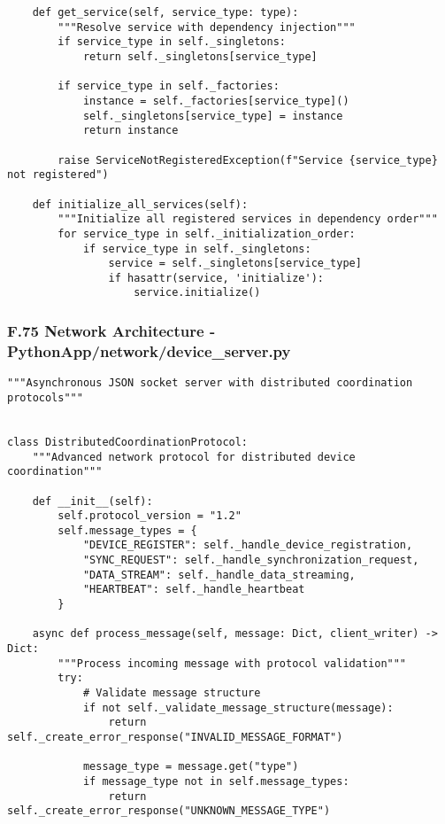 \documentclass[12pt,a4paper]{report}
\begin{document}
{{\begin{verbatim}
    def get_service(self, service_type: type):
        """Resolve service with dependency injection"""
        if service_type in self._singletons:
            return self._singletons[service_type]

        if service_type in self._factories:
            instance = self._factories[service_type]()
            self._singletons[service_type] = instance
            return instance

        raise ServiceNotRegisteredException(f"Service {service_type} not registered")

    def initialize_all_services(self):
        """Initialize all registered services in dependency order"""
        for service_type in self._initialization_order:
            if service_type in self._singletons:
                service = self._singletons[service_type]
                if hasattr(service, 'initialize'):
                    service.initialize()
\end{verbatim}

\subsubsection{F.75 Network Architecture - PythonApp/network/device_server.py}

\begin{verbatim}
"""Asynchronous JSON socket server with distributed coordination protocols"""


class DistributedCoordinationProtocol:
    """Advanced network protocol for distributed device coordination"""

    def __init__(self):
        self.protocol_version = "1.2"
        self.message_types = {
            "DEVICE_REGISTER": self._handle_device_registration,
            "SYNC_REQUEST": self._handle_synchronization_request,
            "DATA_STREAM": self._handle_data_streaming,
            "HEARTBEAT": self._handle_heartbeat
        }

    async def process_message(self, message: Dict, client_writer) -> Dict:
        """Process incoming message with protocol validation"""
        try:
            # Validate message structure
            if not self._validate_message_structure(message):
                return self._create_error_response("INVALID_MESSAGE_FORMAT")

            message_type = message.get("type")
            if message_type not in self.message_types:
                return self._create_error_response("UNKNOWN_MESSAGE_TYPE")


\end{verbatim}}}
\end{document}
